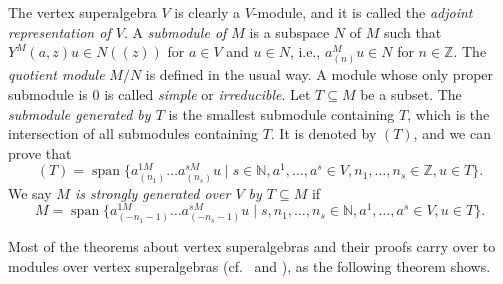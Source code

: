 \documentclass[a4paper, 12pt, reqno]{amsart}
\theoremstyle{remark}
\DeclareMathOperator{\vspan}{span}
\begin{document}
The vertex superalgebra $V$ is clearly a $V$-module, and it is called the \emph{adjoint representation of $V$}.
A \emph{submodule of $M$} is a subspace $N$ of $M$ such that $Y^M(a, z)u \in N((z))$ for $a \in V$ and $u \in N$, i.e., $a^M_{(n)}u \in N$ for $n \in \mathbb{Z}$.
The \emph{quotient module} $M/N$ is defined in the usual way.
A module whose only proper submodule is $0$ is called \emph{simple} or \emph{irreducible}.
Let $T \subseteq M$ be a subset.
The \emph{submodule generated by $T$} is the smallest submodule containing $T$, which is the intersection of all submodules containing $T$.
It is denoted by $(T)$, and we can prove that
\begin{equation*}
  (T) = \vspan\{a^{1M}_{(n_1)}\dots a^{sM}_{(n_s)}u \mid s \in \mathbb{N}, a^1, \dots, a^s \in V, n_1, \dots, n_s \in \mathbb{Z}, u \in T\}.
\end{equation*}
We say \emph{$M$ is strongly generated over $V$ by $T \subseteq M$} if
\begin{equation*}
  M = \vspan\{a^{1M}_{(-n_1 - 1)}\dots a^{sM}_{(-n_s - 1)}u \mid s, n_1, \dots, n_s \in \mathbb{N}, a^1, \dots, a^s \in V, u \in T\}.
\end{equation*}

Most of the theorems about vertex superalgebras and their proofs carry over to modules over vertex superalgebras (cf.\  and ), as the following theorem shows.
\end{document}
